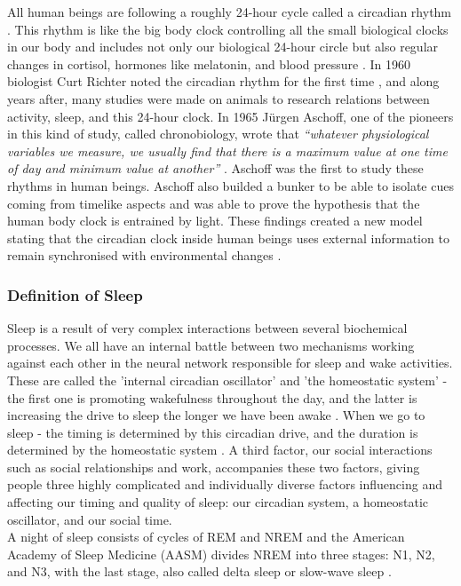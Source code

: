 \documentclass[12pt]{article} %
\begin{document}
All human beings are following a roughly 24-hour cycle called a circadian rhythm \cite{bewellSleep}. This rhythm is like the big body clock controlling all the small biological clocks in our body and includes not only our biological 24-hour circle but also regular changes in cortisol, hormones like melatonin, and blood pressure \cite{bewellSleep}. In 1960 biologist Curt Richter noted the circadian rhythm for the first time \cite{circadian}, and along years after, many studies were made on animals to research relations between activity, sleep, and this 24-hour clock. In 1965 Jürgen Aschoff, one of the pioneers in this kind of study, called chronobiology, wrote that \textit{``whatever physiological variables we measure, we usually find that there is a maximum value at one time of day and minimum value at another''} \cite{rhythm}. Aschoff was the first to study these rhythms in human beings. Aschoff also builded a bunker to be able to isolate cues coming from timelike aspects \cite{rhythm2} and was able to prove the hypothesis that the human body clock is entrained by light. These findings created a new model stating that the circadian clock inside human beings uses external information to remain synchronised with environmental changes \cite{bewellSleep}.

\subsubsection{Definition of Sleep}
Sleep is a result of very complex interactions between several biochemical processes. We all have an internal battle between two mechanisms working against each other in the neural network responsible for sleep and wake activities. These are called the 'internal circadian oscillator' and 'the homeostatic system' - the first one is promoting wakefulness throughout the day, and the latter is increasing the drive to sleep the longer we have been awake \cite{promise}. When we go to sleep - the timing is determined by this circadian drive, and the duration is determined by the homeostatic system \cite{life}. A third factor, our social interactions such as social relationships and work, accompanies these two factors, giving people three highly complicated and individually diverse factors influencing and affecting our timing and quality of sleep: our circadian system, a homeostatic oscillator, and our social time.\\

A night of sleep consists of cycles of REM and NREM and the American Academy of Sleep Medicine (AASM) \cite{aasm} divides NREM into three stages: N1, N2, and N3, with the last stage, also called delta sleep or slow-wave sleep \cite{visual}. 
\end{document}
